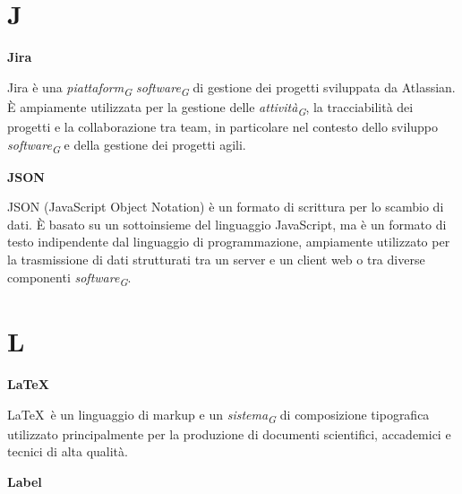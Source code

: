 \documentclass{article}
\begin{document}
\pagebreak
\section*{J}
{}

\vspace{0.4cm}

\textbf{Jira}

\vspace{0.1cm}

Jira è una \textit{piattaform}\textsubscript{\textit{G}} \textit{software}\textsubscript{\textit{G}} di gestione dei progetti sviluppata da Atlassian. È ampiamente utilizzata per la gestione delle \textit{attività}\textsubscript{\textit{G}}, la tracciabilità dei progetti e la collaborazione tra team, in particolare nel contesto dello sviluppo \textit{software}\textsubscript{\textit{G}} e della gestione dei progetti agili.

\vspace{0.4cm}

\textbf{JSON}

\vspace{0.1cm}

JSON (JavaScript Object Notation) è un formato di scrittura per lo scambio di dati. È basato su un sottoinsieme del linguaggio JavaScript, ma è un formato di testo indipendente dal linguaggio di programmazione, ampiamente utilizzato per la trasmissione di dati strutturati tra un server e un client web o tra diverse componenti \textit{software}\textsubscript{\textit{G}}.

\pagebreak
\section*{L}
{}

\vspace{0.4cm}

\textbf{\LaTeX}

\vspace{0.1cm}

\LaTeX\ è un linguaggio di markup e un \textit{sistema}\textsubscript{\textit{G}} di composizione tipografica utilizzato principalmente per la produzione di documenti scientifici, accademici e tecnici di alta qualità.

\vspace{0.4cm}

\textbf{Label}
\end{document}
